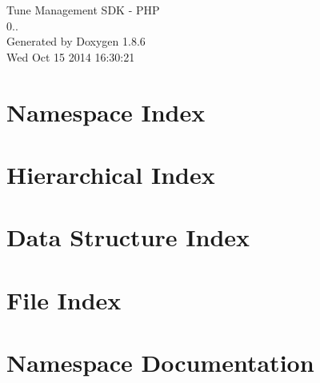 \documentclass[twoside]{book}
\newcommand{\clearemptydoublepage}{%
  \newpage{\pagestyle{empty}\cleardoublepage}%
}
\begin{document}
\hypersetup{pageanchor=false}
\begin{titlepage}
\vspace*{7cm}
\begin{center}%
{\Large Tune Management S\-D\-K -\/ P\-H\-P \\[1ex]\large 0.. }\\
\vspace*{1cm}
{\large Generated by Doxygen 1.8.6}\\
\vspace*{0.5cm}
{\small Wed Oct 15 2014 16:30:21}\\
\end{center}
\end{titlepage}
\clearemptydoublepage
\tableofcontents
\clearemptydoublepage
{}
\hypersetup{pageanchor=true}

\chapter{Namespace Index}

\chapter{Hierarchical Index}

\chapter{Data Structure Index}

\chapter{File Index}

\chapter{Namespace Documentation}











\end{document}
